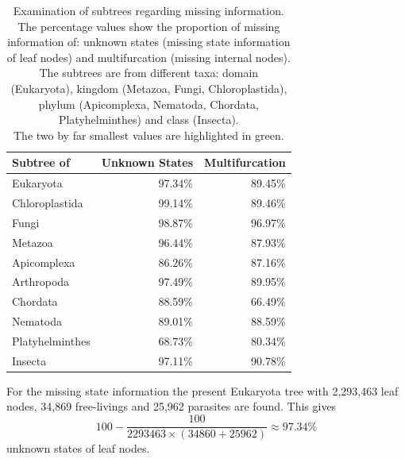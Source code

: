     \begin{table}[h!]
      \begin{center}
        \begin{tabular}{ |l||r|r| }
          \hline
          \bfseries Subtree of & \bfseries Unknown States & \bfseries Multifurcation \\ 
          \hline \hline
          Eukaryota       & 97.34\%  & 89.45\% \\
          \hline \hline
          Chloroplastida  & 99.14\%  & 89.46\% \\ \hline
          Fungi           & 98.87\%  & 96.97\% \\ \hline
          Metazoa         & 96.44\%  & 87.93\% \\
          \hline \hline
          Apicomplexa     & 86.26\%  & 87.16\% \\ \hline
          Arthropoda      & 97.49\%  & 89.95\% \\ \hline
          Chordata        & 88.59\%  & \cellcolor{green!50}66.49\% \\ \hline
          Nematoda        & 89.01\%  & 88.59\% \\ \hline
          Platyhelminthes & \cellcolor{green!50}68.73\%  & 80.34\% \\
          \hline \hline            
          Insecta         & 97.11\%  & 90.78\% \\
          \hline  
        \end{tabular}
      \end{center}
      \caption{Examination of subtrees regarding missing information. \\
        The percentage values show the proportion of missing information of: unknown states (missing state 
          information of leaf nodes) and multifurcation (missing internal nodes). \\
        The subtrees are from different taxa: domain (Eukaryota), kingdom (Metazoa, Fungi, 
          Chloroplastida), phylum (Apicomplexa, Nematoda, Chordata, Platyhelminthes) and class 
          (Insecta). \\
        The two by far smallest values are highlighted in green.} 
      \label{table:percentage loss information subtrees} 
    \end{table}

    For the missing state information the present Eukaryota tree with 2,293,463 leaf nodes, 34,869 
      free-livings and 25,962 parasites are found. This gives
      $$100-\frac{100}{2293463 \times (34860+25962)} \approx 97.34\%$$
      unknown states of leaf nodes.

